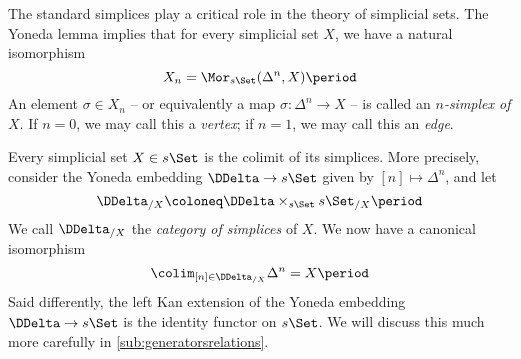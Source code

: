 The standard simplices play a critical role in the theory of simplicial sets.
The Yoneda lemma implies that for every simplicial set $X$, we have a natural isomorphism
\[
  X_n = \Mor_{s\Set}(\Delta^n, X) \period
\]
An element $\sigma \in X_n$ -- or equivalently a map $\sigma \colon \Delta^n \to X$ -- is called an \emph{$n$-simplex of $X$}.
If $n=0$, we may call this a \emph{vertex};
if $n=1$, we may call this an \emph{edge}.

Every simplicial set $X \in s\Set$ is the colimit of its simplices.
More precisely, consider the Yoneda embedding $\DDelta \to s\Set$ given by $[n] \mapsto \Delta^n$, and let
\[
  \DDelta_{/X} \coloneq \DDelta \times_{s\Set} s\Set_{/X} \period
\]
We call $\DDelta_{/X}$ the \emph{category of simplices} of $X$.
We now have a canonical isomorphism
\[
  \colim_{[n]\in\DDelta_{/X}} \Delta^n = X \period
\]
Said differently, the left Kan extension of the Yoneda embedding $\DDelta \to s\Set$ is the identity functor on $s\Set$. 
We will discuss this much more carefully in \ref{sub:generatorsrelations}.

